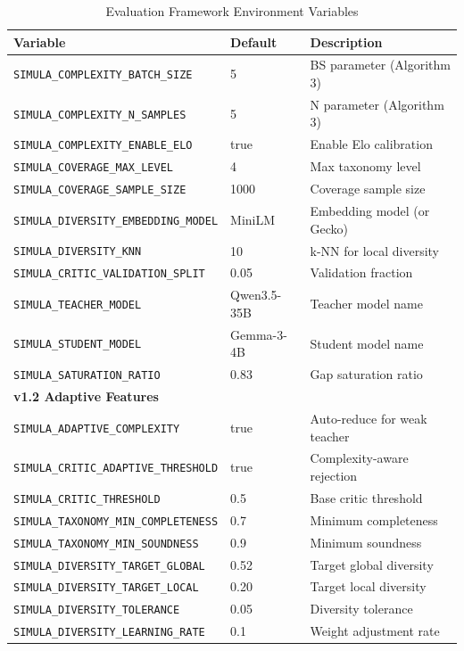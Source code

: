 \begin{table}[H]
\centering
\caption{Evaluation Framework Environment Variables}
\label{tab:eval-env}
\begin{tabularx}{\textwidth}{lp{2cm}X}
\toprule
\textbf{Variable} & \textbf{Default} & \textbf{Description} \\
\midrule
\texttt{SIMULA\_COMPLEXITY\_BATCH\_SIZE} & 5 & BS parameter (Algorithm 3) \\
\texttt{SIMULA\_COMPLEXITY\_N\_SAMPLES} & 5 & N parameter (Algorithm 3) \\
\texttt{SIMULA\_COMPLEXITY\_ENABLE\_ELO} & true & Enable Elo calibration \\
\texttt{SIMULA\_COVERAGE\_MAX\_LEVEL} & 4 & Max taxonomy level \\
\texttt{SIMULA\_COVERAGE\_SAMPLE\_SIZE} & 1000 & Coverage sample size \\
\texttt{SIMULA\_DIVERSITY\_EMBEDDING\_MODEL} & MiniLM & Embedding model (or Gecko) \\
\texttt{SIMULA\_DIVERSITY\_KNN} & 10 & k-NN for local diversity \\
\texttt{SIMULA\_CRITIC\_VALIDATION\_SPLIT} & 0.05 & Validation fraction \\
\texttt{SIMULA\_TEACHER\_MODEL} & Qwen3.5-35B & Teacher model name \\
\texttt{SIMULA\_STUDENT\_MODEL} & Gemma-3-4B & Student model name \\
\texttt{SIMULA\_SATURATION\_RATIO} & 0.83 & Gap saturation ratio \\
\midrule
\multicolumn{3}{l}{\textbf{v1.2 Adaptive Features}} \\
\midrule
\texttt{SIMULA\_ADAPTIVE\_COMPLEXITY} & true & Auto-reduce for weak teacher \\
\texttt{SIMULA\_CRITIC\_ADAPTIVE\_THRESHOLD} & true & Complexity-aware rejection \\
\texttt{SIMULA\_CRITIC\_THRESHOLD} & 0.5 & Base critic threshold \\
\texttt{SIMULA\_TAXONOMY\_MIN\_COMPLETENESS} & 0.7 & Minimum completeness \\
\texttt{SIMULA\_TAXONOMY\_MIN\_SOUNDNESS} & 0.9 & Minimum soundness \\
\texttt{SIMULA\_DIVERSITY\_TARGET\_GLOBAL} & 0.52 & Target global diversity \\
\texttt{SIMULA\_DIVERSITY\_TARGET\_LOCAL} & 0.20 & Target local diversity \\
\texttt{SIMULA\_DIVERSITY\_TOLERANCE} & 0.05 & Diversity tolerance \\
\texttt{SIMULA\_DIVERSITY\_LEARNING\_RATE} & 0.1 & Weight adjustment rate \\
\bottomrule
\end{tabularx}
\end{table}

